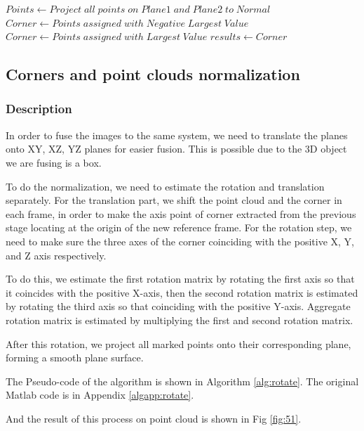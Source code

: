 \documentclass[10pt,a4paper]{article}
\begin{document}
\begin{algorithm}
\begin{algorithmic}[1]
		\State  
		
	    \State $Points \gets Project \;all \;points \;on \;Plane1 \;and \;Plane2 \;to \;Normal $  
		\State $Corner \gets Points \;assigned \;with \;Negative \;Largest \;Value$
		\Else
		\State $Corner \gets Points \;assigned \;with \;Largest \;Value$
		\EndIf
		\State $results\gets Corner$         
		\State {}  
		\EndFunction 
		
	\end{algorithmic}  
\end{algorithm} 

\newpage

\subsection{Corners and point clouds normalization }  
\subsubsection{Description}
%
In order to fuse the images to the same system, we need to translate the planes onto XY, XZ, YZ planes for easier fusion.
This is possible due to the 3D object we are fusing is a box.

To do the normalization, we need to estimate the rotation and translation separately. 
For the translation part, we shift the point cloud and the corner in each frame, in order to make the axis point of corner extracted from the previous stage locating at the origin of the new reference frame. For the rotation step, we need to make sure the three axes of the corner coinciding with the positive X, Y, and Z axis respectively. 

To do this, we estimate the first rotation matrix by rotating the first axis so that it coincides with the positive X-axis, then the second rotation matrix is estimated by rotating the third axis so that coinciding with the positive Y-axis. Aggregate rotation matrix is estimated by multiplying the first and second rotation matrix. 

After this rotation, we project all marked points onto their corresponding plane, forming a smooth plane surface.

The Pseudo-code of the algorithm is shown in Algorithm \ref{alg:rotate}. 
The original Matlab code is in Appendix \ref{algapp:rotate}.

And the result of this process on point cloud is shown in Fig \ref{fig:51}.
\end{document}
